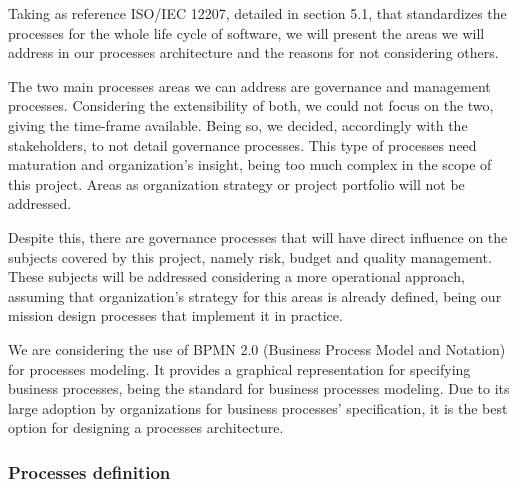 Taking as reference ISO/IEC 12207, detailed in section 5.1, that standardizes the processes for the whole life cycle of software, we will present the areas we will address in our processes architecture and the reasons for not considering others.\par
The two main processes areas we can address are governance and management processes. Considering the extensibility of both, we could not focus on the two, giving the time-frame available. Being so, we decided, accordingly with the stakeholders, to not detail governance processes. This type of processes need maturation and organization's insight, being too much complex in the scope of this project. Areas as organization strategy or project portfolio will not be addressed.\par 
Despite this, there are governance processes that will have direct influence on the subjects covered by this project, namely risk, budget and quality management. These subjects will be addressed considering a more operational approach, assuming that organization's strategy for this areas is already defined, being our mission design processes that implement it in practice.\par
We are considering the use of BPMN 2.0 (Business Process Model and Notation) for processes modeling. It provides a graphical representation for specifying business processes, being the standard for business processes modeling. Due to its large adoption by organizations for business processes' specification, it is the best option for designing a processes architecture. \par


\subsubsection{Processes definition}

